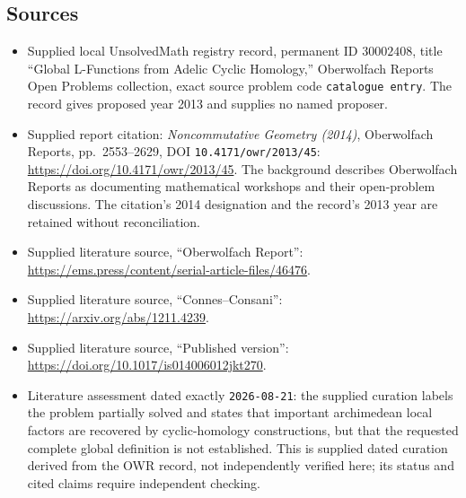 \documentclass[11pt]{article}
\begin{document}
\subsection{Sources}
\begin{itemize}
\item Supplied local UnsolvedMath registry record, permanent ID \(30002408\), title ``Global L-Functions from Adelic Cyclic Homology,'' Oberwolfach Reports Open Problems collection, exact source problem code \texttt{catalogue entry}. The record gives proposed year 2013 and supplies no named proposer.
\item Supplied report citation: \emph{Noncommutative Geometry (2014)}, Oberwolfach Reports, pp.~2553--2629, DOI \texttt{10.4171/owr/2013/45}: \url{https://doi.org/10.4171/owr/2013/45}. The background describes Oberwolfach Reports as documenting mathematical workshops and their open-problem discussions. The citation's 2014 designation and the record's 2013 year are retained without reconciliation.
\item Supplied literature source, ``Oberwolfach Report'': \url{https://ems.press/content/serial-article-files/46476}.
\item Supplied literature source, ``Connes--Consani'': \url{https://arxiv.org/abs/1211.4239}.
\item Supplied literature source, ``Published version'': \url{https://doi.org/10.1017/is014006012jkt270}.
\item Literature assessment dated exactly \texttt{2026-08-21}: the supplied curation labels the problem partially solved and states that important archimedean local factors are recovered by cyclic-homology constructions, but that the requested complete global definition is not established. This is supplied dated curation derived from the OWR record, not independently verified here; its status and cited claims require independent checking.
\end{itemize}
\end{document}
